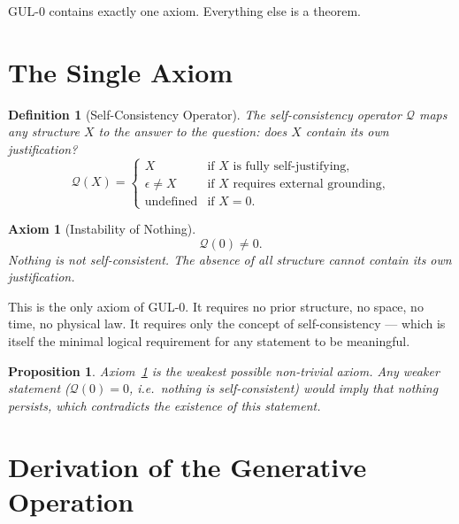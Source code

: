 \documentclass[11pt]{article}
\newtheorem{axiom}{Axiom}
\newtheorem{definition}{Definition}
\newtheorem{proposition}{Proposition}
\begin{document}
GUL-0 contains exactly one axiom. Everything else is a theorem.

\section{The Single Axiom}
\label{sec:axiom}

\begin{definition}[Self-Consistency Operator]
  The self-consistency operator $\mathcal{Q}$ maps any structure $X$
  to the answer to the question: \emph{does $X$ contain its own
  justification?}
  \begin{equation}
    \mathcal{Q}(X) =
    \begin{cases}
      X        & \text{if } X \text{ is fully self-justifying,} \\
      \epsilon \neq X & \text{if } X \text{ requires external grounding,} \\
      \text{undefined} & \text{if } X = 0.
    \end{cases}
  \end{equation}
\end{definition}

\begin{axiom}[Instability of Nothing]
  \label{ax:nothing}
  \begin{equation}
    \mathcal{Q}(0) \neq 0.
  \end{equation}
  Nothing is not self-consistent. The absence of all structure cannot
  contain its own justification.
\end{axiom}

This is the only axiom of GUL-0. It requires no prior structure,
no space, no time, no physical law. It requires only the concept of
self-consistency --- which is itself the minimal logical requirement
for any statement to be meaningful.

\begin{proposition}
  Axiom~\ref{ax:nothing} is the weakest possible non-trivial axiom.
  Any weaker statement ($\mathcal{Q}(0)=0$, i.e.\ nothing is
  self-consistent) would imply that nothing persists, which contradicts
  the existence of this statement.
\end{proposition}

\section{Derivation of the Generative Operation}
\label{sec:derivation}
\end{document}
